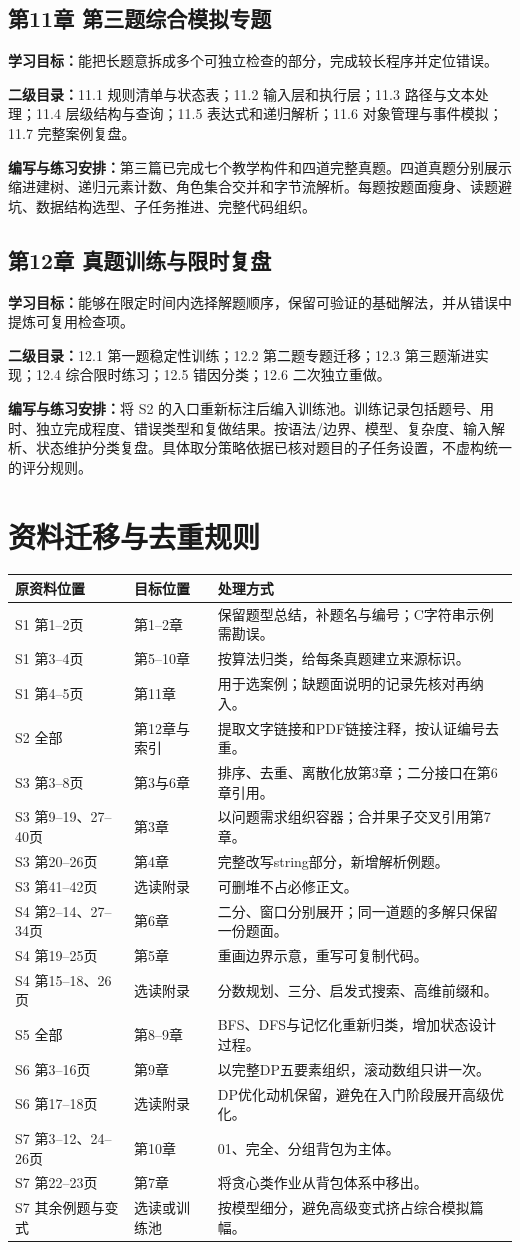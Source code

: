 \documentclass[UTF8,11pt,a4paper,fontset=none]{ctexart}
\newcommand{\topic}[4]{\subsection{#1}\textbf{学习目标：}#2\par\textbf{二级目录：}#3\par\textbf{编写与练习安排：}#4\par}
\begin{document}
\topic{第11章 第三题综合模拟专题}
{能把长题意拆成多个可独立检查的部分，完成较长程序并定位错误。}
{11.1 规则清单与状态表；11.2 输入层和执行层；11.3 路径与文本处理；11.4 层级结构与查询；11.5 表达式和递归解析；11.6 对象管理与事件模拟；11.7 完整案例复盘。}
{第三篇已完成七个教学构件和四道完整真题。四道真题分别展示缩进建树、递归元素计数、角色集合交并和字节流解析。每题按题面瘦身、读题避坑、数据结构选型、子任务推进、完整代码组织。}

\topic{第12章 真题训练与限时复盘}
{能够在限定时间内选择解题顺序，保留可验证的基础解法，并从错误中提炼可复用检查项。}
{12.1 第一题稳定性训练；12.2 第二题专题迁移；12.3 第三题渐进实现；12.4 综合限时练习；12.5 错因分类；12.6 二次独立重做。}
{将 S2 的入口重新标注后编入训练池。训练记录包括题号、用时、独立完成程度、错误类型和复做结果。按语法/边界、模型、复杂度、输入解析、状态维护分类复盘。具体取分策略依据已核对题目的子任务设置，不虚构统一的评分规则。}

\section{资料迁移与去重规则}
\begin{longtable}{P{3.8cm}P{2.8cm}P{8.2cm}}
\toprule 原资料位置 & 目标位置 & 处理方式 \\\midrule\endhead
S1 第1--2页 & 第1--2章 & 保留题型总结，补题名与编号；C字符串示例需勘误。\\
S1 第3--4页 & 第5--10章 & 按算法归类，给每条真题建立来源标识。\\
S1 第4--5页 & 第11章 & 用于选案例；缺题面说明的记录先核对再纳入。\\
S2 全部 & 第12章与索引 & 提取文字链接和PDF链接注释，按认证编号去重。\\
S3 第3--8页 & 第3与6章 & 排序、去重、离散化放第3章；二分接口在第6章引用。\\
S3 第9--19、27--40页 & 第3章 & 以问题需求组织容器；合并果子交叉引用第7章。\\
S3 第20--26页 & 第4章 & 完整改写string部分，新增解析例题。\\
S3 第41--42页 & 选读附录 & 可删堆不占必修正文。\\
S4 第2--14、27--34页 & 第6章 & 二分、窗口分别展开；同一道题的多解只保留一份题面。\\
S4 第19--25页 & 第5章 & 重画边界示意，重写可复制代码。\\
S4 第15--18、26页 & 选读附录 & 分数规划、三分、启发式搜索、高维前缀和。\\
S5 全部 & 第8--9章 & BFS、DFS与记忆化重新归类，增加状态设计过程。\\
S6 第3--16页 & 第9章 & 以完整DP五要素组织，滚动数组只讲一次。\\
S6 第17--18页 & 选读附录 & DP优化动机保留，避免在入门阶段展开高级优化。\\
S7 第3--12、24--26页 & 第10章 & 01、完全、分组背包为主体。\\
S7 第22--23页 & 第7章 & 将贪心类作业从背包体系中移出。\\
S7 其余例题与变式 & 选读或训练池 & 按模型细分，避免高级变式挤占综合模拟篇幅。\\
\bottomrule
\end{longtable}
\end{document}
